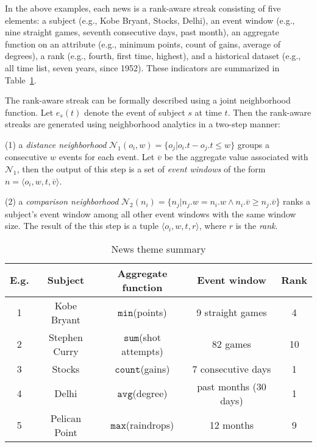 In the above examples, each news is a rank-aware streak consisting of five elements: a subject (e.g., Kobe Bryant, Stocks, Delhi), an event window (e.g., nine straight games, seventh consecutive days, past month), an aggregate function on an attribute
(e.g., minimum points, count of gains, average of degrees), a rank (e.g., fourth, first time, highest), and a
historical dataset (e.g., all time list, seven years, since 1952). These indicators are summarized in
Table~\ref{tbl:news-example}.

The rank-aware streak can be formally described using a joint neighborhood function. 
Let $e_s(t)$ denote the event of subject $s$ at time $t$. Then the rank-aware streaks are generated using neighborhood analytics in a two-step manner: 

(1) a \emph{distance neighborhood} $\mathcal{N}_1(o_i,w)=\{o_j | o_i.t - o_j.t \leq w \}$ groups a consecutive $w$ events for each event. Let $\overline{v}$ be the aggregate value associated with $\mathcal{N}_1$, then the output of this step is a set of \emph{event windows} of the form  $n=\langle o_i, w, t, \overline{v} \rangle$.

(2) a \emph{comparison neighborhood} $\mathcal{N}_2(n_i) = \{n_j | n_j.w = n_i.w \wedge n_i.\overline{v} \geq n_j.\overline{v} \}$ ranks a subject's event window among all other event windows with the same window size. The result of the this step is a tuple $\langle o_i, w, t, r \rangle$, where $r$ is the \emph{rank}.





\begin{table}[h]
\centering
\begin{tabular}{|c|c|c|c|c|}
\hline
\textbf{E.g.} & \textbf{Subject} & \textbf{Aggregate function} & \textbf{Event window} & \textbf{Rank} \\
\hline
1 & Kobe Bryant &$\mathtt{min}$(points) & 9 straight games & 4 \\
\hline
2 & Stephen Curry &$\mathtt{sum}$(shot attempts) & 82 games & 10 \\
\hline
3 & Stocks &$\mathtt{count}$(gains) & 7 consecutive days & 1 \\
\hline
4 & Delhi &$\mathtt{avg}$(degree) & past months (30 days) & 1 \\
\hline
5 & Pelican Point &$\mathtt{max}$(raindrops) & 12 months & 9 \\
\hline
\end{tabular}
\caption{News theme summary}
\label{tbl:news-example}
\end{table}

